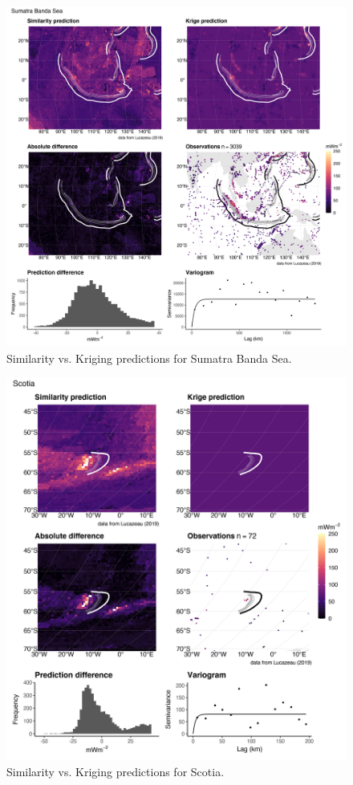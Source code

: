 \documentclass[draft,linenumbers]{agujournal2018}
\begin{document}
\begin{figure}[h]

{\centering \includegraphics[width=0.95\linewidth,]{../figs/diff/comp/Sumatra_Banda_Sea} 

}

\caption{Similarity vs. Kriging predictions for Sumatra Banda Sea.}\label{fig:sumatra.banda.sea.comp}
\end{figure}

\begin{figure}[h]

{\centering \includegraphics[width=0.95\linewidth,]{../figs/diff/comp/Scotia} 

}

\caption{Similarity vs. Kriging predictions for Scotia.}\label{fig:scotia.comp}
\end{figure}
\end{document}

